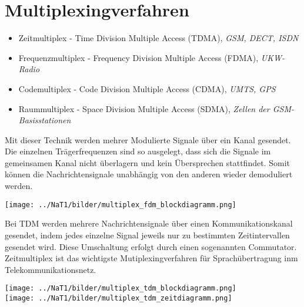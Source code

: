 \section{Multiplexingverfahren} \label{multiplex}
\begin{itemize}
  \item Zeitmultiplex - Time Division Multiple Access (TDMA), \textit{GSM, DECT, ISDN}
  \item Frequenzmultiplex - Frequency Division Multiple Access (FDMA), \textit{UKW-Radio}
  \item Codemultiplex - Code Division Multiple Access (CDMA), \textit{UMTS, GPS}
  \item Raummultiplex - Space Division Multiple Access (SDMA), \textit{Zellen der GSM-Basisstationen}
\end{itemize}

Mit dieser Technik werden mehrer Modulierte Signale über ein Kanal gesendet. Die einzelnen
Trägerfrequenzen sind so ausgelegt, dass sich die Signale im gemeinsamen Kanal nicht überlagern und
kein Übersprechen stattfindet. Somit können die Nachrichtensignale unabhängig von den anderen
wieder demoduliert werden.
\begin{center}
    \texttt{[image: ../NaT1/bilder/multiplex\_fdm\_blockdiagramm.png]}
\end{center}

Bei TDM werden mehrere Nachrichtensignale über einen Kommunikationskanal gesendet, indem jedes
einzelne Signal jeweils nur zu bestimmten Zeitintervallen gesendet wird. Diese Umschaltung erfolgt
durch einen sogenannten Commutator. \\
Zeitmultiplex ist das wichtigste Mutiplexingverfahren für
Sprachübertragung inm Telekommunikationsnetz.
\begin{center}
    \texttt{[image: ../NaT1/bilder/multiplex\_tdm\_blockdiagramm.png]} \\
    \texttt{[image: ../NaT1/bilder/multiplex\_tdm\_zeitdiagramm.png]}     
\end{center}